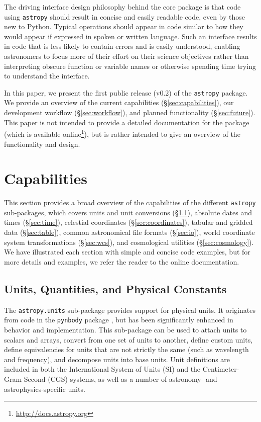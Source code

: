 \documentclass[traditabstract]{aa}
\newcommand{\astropy}{\texttt{astropy}\xspace}
\begin{document}
The driving interface design philosophy behind the core package is that code
using \astropy should result in concise and easily readable code, even by those new to
Python. Typical operations should appear in code similar to how they would
appear if expressed in spoken or written language. Such an interface results in
code that is less likely to contain errors and is easily understood, enabling
astronomers to focus more of their effort on their science objectives rather
than interpreting obscure function or variable names or otherwise spending time
trying to understand the interface.

In this paper, we present the first public release (v0.2) of the \astropy
package. We provide an overview of the current capabilities
(\S\ref{sec:capabilities}), our development workflow (\S\ref{sec:workflow}),
and planned functionality (\S\ref{sec:future}). This paper is not intended to
provide a detailed documentation for the package (which is available
online\footnote{\url{http://docs.astropy.org}}), but is rather intended to give
an overview of the functionality and design.

\section{Capabilities}

This section provides a broad overview of the capabilities of the different
\astropy sub-packages, which covers units and unit conversions
(\S\ref{sec:units_main}), absolute dates and times (\S\ref{sec:time}),
celestial coordinates (\S\ref{sec:coordinates}), tabular and gridded data
(\S\ref{sec:table}), common astronomical file formats (\S\ref{sec:io}), world
coordinate system transformations (\S\ref{sec:wcs}), and cosmological utilities
(\S\ref{sec:cosmology}). We have illustrated each section with simple and
concise code examples, but for more details and examples, we refer the reader
to the online documentation\footnotemark[4].

\label{sec:capabilities}

\subsection{Units, Quantities, and Physical Constants}

\label{sec:units_main}


The \texttt{astropy.units} sub-package provides support for physical units. It
originates from code in the \texttt{pynbody}
package \citep{pynbody}, but has been
significantly enhanced in behavior and implementation. This sub-package can be
used to attach units to scalars and arrays, convert from one set of units to
another, define custom units, define equivalencies for units that are not
strictly the same (such as wavelength and frequency), and decompose units into
base units. Unit definitions are included in both the International System of
Units (SI) and the Centimeter-Gram-Second (CGS) systems, as well as a number of
astronomy- and astrophysics-specific units.
\end{document}

